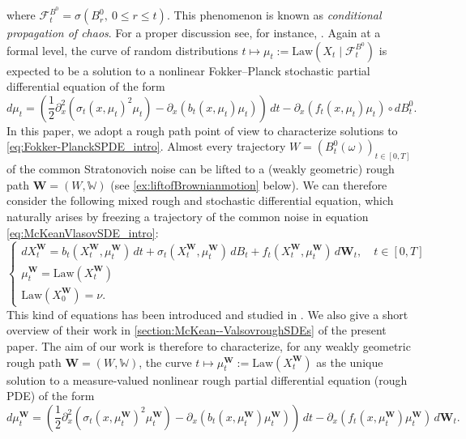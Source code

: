 \documentclass[10pt, a4paper]{article} %
\theoremstyle{definition}
\theoremstyle{plain}
\begin{document}
where $\mathcal{F}_t^{B^0} = \sigma(B^0_r , \ 0 \le r \le t)$.
This phenomenon is known as \textit{conditional propagation of chaos}. For a proper discussion see, for instance, \cite[Section 2.1.2]{CARMONADELARUE_volumeII}. 
Again at a formal level, the curve of random distributions $t \mapsto \mu_t := \text{Law}(X_t \mid \mathcal{F}_t^{B^0})$ is expected to be a solution to a nonlinear Fokker--Planck stochastic partial differential equation of the form \begin{equation} \label{eq:Fokker-PlanckSPDE_intro}
    d\mu_t = \left( \frac{1}{2} \partial^2_x (\sigma_t(x,\mu_t)^2\mu_t) - \partial_x ( b_t(x,\mu_t)  \mu_t) \right) \, dt  - \partial_x (f_t(x,\mu_t) \mu_t) \circ dB^0_t . 
\end{equation}
In this paper, we adopt a rough path point of view to characterize solutions to \eqref{eq:Fokker-PlanckSPDE_intro}.
Almost every trajectory $W = (B^0_t(\omega))_{t \in [0,T]}$ of the common Stratonovich noise can be lifted to a (weakly geometric) rough path $\mathbf{W}=(W,\mathbb{W})$ (see \cref{ex:liftofBrownianmotion} below). 
We can therefore consider the following mixed rough and stochastic differential equation, which naturally arises by freezing a trajectory of the common noise in equation \eqref{eq:McKeanVlasovSDE_intro}:
\begin{equation} \label{eq:McKeanVlasovroughSDE_intro}
    \begin{cases}
        dX^\mathbf{W}_t = b_t(X^\mathbf{W}_t, \mu^\mathbf{W}_t) \, dt + \sigma_t (X^\mathbf{W}_t, \mu^\mathbf{W}_t) \, dB_t + f_t (X^\mathbf{W}_t, \mu^\mathbf{W}_t)  \, d\mathbf{W}_t, \quad t \in [0,T] \\
        \mu^\mathbf{W}_t = \text{Law}(X^\mathbf{W}_t)  \\
        \text{Law}(X^\mathbf{W}_0) = \nu . 
    \end{cases}
\end{equation}
This kind of equations has been introduced and studied in \cite{FHL25}. We also give a short overview of their work in \cref{section:McKean--ValsovroughSDEs} of the present paper.  
The aim of our work is therefore to characterize, for any weakly geometric rough path $\mathbf{W}=(W,\mathbb{W})$, the curve $t \mapsto \mu_t^\mathbf{W}:=\text{Law}(X_t^\mathbf{W})$ as the unique solution to a measure-valued nonlinear rough partial differential equation (rough PDE) of the form \begin{equation*}
    d\mu^\mathbf{W}_t = \left( \frac{1}{2} \partial^2_x (\sigma_t(x,\mu^\mathbf{W}_t)^2 \mu^\mathbf{W}_t) - \partial_x (b_t(x,\mu^\mathbf{W}_t) \mu^\mathbf{W}_t) \right) \, dt - \partial_x (f_t(x,\mu^\mathbf{W}_t) \mu^\mathbf{W}_t) \, d\mathbf{W}_t. 
\end{equation*} 
\end{document}
